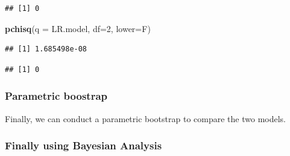 \documentclass[
]{article}
\newenvironment{Shaded}{\begin{snugshade}}{\end{snugshade}}
\newcommand{\DataTypeTok}[1]{\textcolor[rgb]{0.13,0.29,0.53}{#1}}
\newcommand{\DecValTok}[1]{\textcolor[rgb]{0.00,0.00,0.81}{#1}}
\newcommand{\KeywordTok}[1]{\textcolor[rgb]{0.13,0.29,0.53}{\textbf{#1}}}
\newcommand{\NormalTok}[1]{#1}
\newcommand{\OperatorTok}[1]{\textcolor[rgb]{0.81,0.36,0.00}{\textbf{#1}}}
\begin{document}
\begin{Shaded}
\end{Shaded}

\begin{verbatim}
## [1] 0
\end{verbatim}

\begin{Shaded}
\begin{Highlighting}[]
\KeywordTok{pchisq}\NormalTok{(}\DataTypeTok{q =}\NormalTok{ LR.model, }\DataTypeTok{df=}\DecValTok{2}\NormalTok{, }\DataTypeTok{lower=}\NormalTok{F)}
\end{Highlighting}
\end{Shaded}

\begin{verbatim}
## [1] 1.685498e-08
\end{verbatim}

\begin{Shaded}
\end{Shaded}

\begin{verbatim}
## [1] 0
\end{verbatim}

\hypertarget{parametric-boostrap}{%
\subsubsection{Parametric boostrap}\label{parametric-boostrap}}

Finally, we can conduct a parametric bootstrap to compare the two
models.

\hypertarget{finally-using-bayesian-analysis}{%
\subsubsection{Finally using Bayesian
Analysis}\label{finally-using-bayesian-analysis}}
\end{document}
